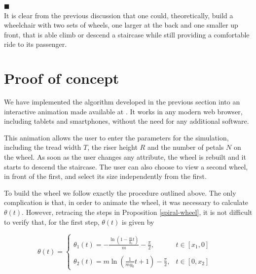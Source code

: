 \documentclass{article}
\theoremstyle{theorem}
\theoremstyle{theorem}
\begin{document}
\hfill $\blacksquare$ \\

It is clear from the previous discussion that one could,
theoretically, build a wheelchair with two sets of wheels, one larger
at the back and one smaller up front, that is able climb or descend a
staircase while still providing a comfortable ride to its passenger.

\section{Proof of concept}
\label{sec:proof-of-concept}

We have implemented the algorithm developed in the previous section
into an interactive animation made available at
\cite{web-animation}. It works in any modern web browser, including
tablets and smartphones, without the need for any additional software.

This animation allows the user to enter the parameters for the
simulation, including the tread width $T$, the riser height $R$ and
the number of petals $N$ on the wheel. As soon as the user changes any
attribute, the wheel is rebuilt and it starts to descend the
staircase. The user can also choose to view a second wheel, in front
of the first, and select its size independently from the first.

To build the wheel we follow exactly the procedure outlined above. The
only complication is that, in order to animate the wheel, it was
necessary to calculate $\theta(t)$. However, retracing the steps in
Proposition \ref{spiral-wheel}, it is not difficult to verify that,
for the first step, $\theta(t)$ is given by

\begin{equation}
  \theta(t)=
  \left \lbrace
    \begin{array}{ll}
      \theta_1(t)=-\frac{\ln\left(1-\frac{m}{y_0}t\right)}{m}-\frac{\pi}{2},
      & t \in \left[x_1,0\right]
      \\
      \\
      \theta_2(t)=m\ln\left(\frac{1}{my_0}t+1\right)-\frac{\pi}{2},
      & t \in \left[0, x_2\right]
    \end{array}
  \right. \quad
\end{equation}
\end{document}
